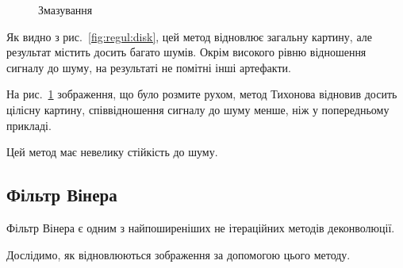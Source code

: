 \documentclass{diploma}
\begin{document}
      \begin{figure}[ht]
        \hfill
        \caption{Змазування}
        \label{fig:regul:motion}
      \end{figure}

      Як видно з рис.~\ref{fig:regul:disk}, цей метод відновлює загальну
      картину, але результат містить досить багато шумів.
      Окрім високого рівню відношення сигналу до шуму, на результаті не
      помітні інші артефакти.

      На рис.~\ref{fig:regul:motion} зображення, що було розмите рухом, метод
      Тихонова відновив досить цілісну картину, співвідношення сигналу до шуму
      менше, ніж у попередньому прикладі.

      Цей метод має невелику стійкість до шуму.
    \subsection{Фільтр Вінера}
      Фільтр Вінера є одним з найпоширеніших не ітераційних методів
      деконволюції.

      Дослідимо, як відновлюються зображення за допомогою цього методу.
\end{document}
